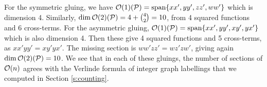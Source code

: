 	For the symmetric gluing, we have $\mathcal{O}(1)(\mathcal{P}) = \text{span}\{xx',yy',zz',ww'\}$ which is dimension 4. Similarly, $\dim \mathcal{O}(2)(\mathcal{P}) = 4+\binom{4}{2} = 10$, from 4 squared functions and 6 cross-terms. For the asymmetric gluing, $\mathcal{O}(1)(\mathcal{P}) = \text{span}\{xx',yy',xy',yx'\}$ which is also dimension 4. Then these give 4 squared functions and 5 cross-terms, as $xx'yy' = xy'yx'$. The missing section is $ww'zz' = wz'zw'$, giving again $\dim\mathcal{O}(2)(\mathcal{P}) = 10$. We see that in each of these gluings, the number of sections of $\mathcal{O}(n)$ agrees with the Verlinde formula of integer graph labellings that we computed in Section \ref{s:counting}.